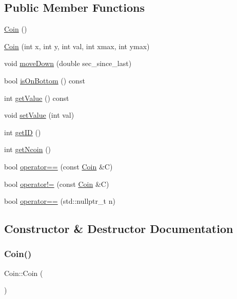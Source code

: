 \subsection*{Public Member Functions}
\begin{DoxyCompactItemize}
\item 
\mbox{\hyperlink{class_coin_a94b2130e2d3ac956ba47271ad81c64f5}{Coin}} ()
\item 
\mbox{\hyperlink{class_coin_a15165b502ff8217f0d85df18a9a30179}{Coin}} (int x, int y, int val, int xmax, int ymax)
\item 
void \mbox{\hyperlink{class_coin_af45c31b09753600787ffe0319db28298}{move\+Down}} (double sec\+\_\+since\+\_\+last)
\item 
bool \mbox{\hyperlink{class_coin_a210e01a3e058d02076fe3b138785703b}{is\+On\+Bottom}} () const
\item 
int \mbox{\hyperlink{class_coin_a53c8bf65afdde1422cfda51d753d74b7}{get\+Value}} () const
\item 
void \mbox{\hyperlink{class_coin_a87813c8eef4d59ef8136b0cc651a80de}{set\+Value}} (int val)
\item 
int \mbox{\hyperlink{class_coin_ad0a324384f93ebe7ef0b9786f1ceaae4}{get\+ID}} ()
\item 
int \mbox{\hyperlink{class_coin_a218706448b94dbdf9299603f2195c064}{get\+Ncoin}} ()
\item 
bool \mbox{\hyperlink{class_coin_ae12c00f84a81afbb7edb2aa3b9842683}{operator==}} (const \mbox{\hyperlink{class_coin}{Coin}} \&C)
\item 
bool \mbox{\hyperlink{class_coin_a67152a3b3ca628c5a122bea522a80b6e}{operator!=}} (const \mbox{\hyperlink{class_coin}{Coin}} \&C)
\item 
bool \mbox{\hyperlink{class_coin_a20ef59bfc867081e452d38daded77e08}{operator==}} (std\+::nullptr\+\_\+t n)
\end{DoxyCompactItemize}


\subsection{Constructor \& Destructor Documentation}
\mbox{\label{class_coin_a94b2130e2d3ac956ba47271ad81c64f5}} 
\subsubsection{\texorpdfstring{Coin()}{Coin()}\hspace{0.1cm}{\footnotesize\ttfamily [1/2]}}
{\footnotesize\ttfamily Coin\+::\+Coin (\begin{DoxyParamCaption}{ }\end{DoxyParamCaption})}

